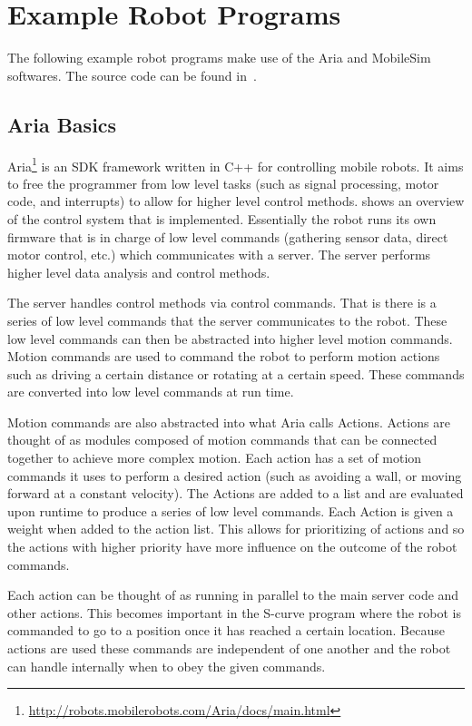 \documentclass[main.tex]{subfiles}
\begin{document}
\section{Example Robot Programs}
The following example robot programs make use of the Aria and MobileSim
softwares. The source code can be found in~.

\subsection{Aria Basics}

Aria\footnote{\url{http://robots.mobilerobots.com/Aria/docs/main.html}} is an
SDK framework written in C++ for controlling mobile robots. It aims to free the
programmer from low level tasks (such as signal processing, motor code, and
interrupts) to allow for higher level control methods.   shows
an overview of the control system that is implemented.  Essentially the robot
runs its own firmware that is in charge of low level commands (gathering sensor
data, direct motor control, etc.) which communicates with a server. The server
performs higher level data analysis and control methods. 

The server handles control methods via control commands. That is there is a
series of low level commands that the server communicates to the robot. These
low level commands can then be abstracted into higher level motion commands.
Motion commands are used to command the robot to perform motion actions such as
driving a certain distance or rotating at a certain speed. These commands are
converted into low level commands at run time.

Motion commands are also abstracted into what Aria calls Actions. Actions are
thought of as modules composed of motion commands that can be connected together
to achieve more complex motion. Each action has a set of motion commands it uses
to perform a desired action (such as avoiding a wall, or moving forward at a
constant velocity).  The Actions are added to a list and are evaluated upon
runtime to produce a series of low level commands. Each Action is given a weight
when added to the action list. This allows for prioritizing of actions and so
the actions with higher priority have more influence on the outcome of the robot
commands.

Each action can be thought of as running in parallel to the main server code and
other actions. This becomes important in the S-curve program where the robot is
commanded to go to a position once it has reached a certain location. Because
actions are used these commands are independent of one another and the robot can
handle internally when to obey the given commands. 
\end{document}
